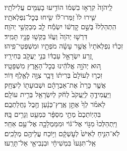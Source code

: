 \documentclass[twoside, openany, parskip=half, 11pt]{book}
\begin{document}
\begin{narrow}		
 לַֽיהֹוָה֙ קִרְא֣וּ בִשְׁמ֔וֹ \hfill
 הוֹדִ֥יעוּ בָעַמִּ֖ים עֲלִילֹתָֽיו׃\\
 שִׁ֤ירוּ לוֹ֙ זַמְּרוּ־ל֔וֹ \hfill שִׂ֖יחוּ בְּכׇל־נִפְלְאֹתָֽיו׃\\
 הִֽתְהַלְלוּ֙ בְּשֵׁ֣ם קׇדְשׁ֔וֹ \hfill יִשְׂמַ֕ח לֵ֖ב מְבַקְשֵׁ֥י יְהֹוָֽה׃\\
 דִּרְשׁ֤וּ יְהֹוָה֙ וְעֻזּ֔וֹ \hfill בַּקְּשׁ֥וּ פָנָ֖יו תָּמִֽיד׃\\
 זִכְר֗וּ נִפְלְאֹתָיו֙ אֲשֶׁ֣ר עָשָׂ֔ה \hfill מֹפְתָ֖יו וּמִשְׁפְּטֵי־פִֽיהוּ׃\\
 זֶ֚רַע יִשְׂרָאֵ֣ל עַבְדּ֔וֹ \hfill בְּנֵ֥י יַעֲקֹ֖ב בְּחִירָֽיו׃\\
 ה֚וּא יְהֹוָ֣ה אֱלֹהֵ֔ינוּ \hfill בְּכׇל־הָאָ֖רֶץ מִשְׁפָּטָֽיו׃\\
 זִכְר֤וּ לְעוֹלָם֙ בְּרִית֔וֹ \hfill דָּבָ֥ר צִוָּ֖ה לְאֶ֥לֶף דּֽוֹר׃\\
 אֲשֶׁ֤ר כָּרַת֙ אֶת־אַבְרָהָ֔ם \hfill וּשְׁבוּעָת֖וֹ לְיִצְחָֽק׃\\
 וַיַּעֲמִידֶ֤הָ לְיַֽעֲקֹב֙ לְחֹ֔ק \hfill לְיִשְׂרָאֵ֖ל בְּרִ֥ית עוֹלָֽם׃\\
 לֵאמֹ֗ר לְךָ֙ אֶתֵּ֣ן אֶֽרֶץ־כְּנָ֔עַן \hfill חֶ֖בֶל נַחֲלַתְכֶֽם׃\\
 בִּהְיֽוֹתְכֶם֙ מְתֵ֣י מִסְפָּ֔ר \hfill כִּמְעַ֖ט וְגָרִ֥ים בָּֽהּ׃\\
 וַיִּֽתְהַלְּכוּ֙ מִגּ֣וֹי אֶל־גּ֔וֹי \hfill וּמִמַּמְלָכָ֖ה אֶל־עַ֥ם אַחֵֽר׃\\
 לֹֽא־הִנִּ֤יחַ לְאִישׁ֙ לְעׇשְׁקָ֔ם \hfill וַיּ֥וֹכַח עֲלֵיהֶ֖ם מְלָכִֽים׃\\
 אַֽל־תִּגְּעוּ֙ בִּמְשִׁיחָ֔י \hfill וּבִנְבִיאַ֖י אַל־תָּרֵֽעוּ׃\\
 

\end{narrow}
\end{document}
